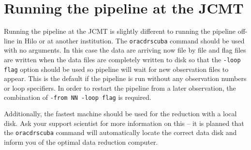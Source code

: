 \documentclass[twoside,11pt]{article}
\newcommand{\xlabel}[1]{}
\renewcommand{\_}{\texttt{\symbol{95}}}
\begin{document}
\section{Running the pipeline at the JCMT\xlabel{running_the_pipeline_at_the_jcmt}}

Running the pipeline at the JCMT is slightly different to running the pipeline
off-line in Hilo or at another institution.  The \texttt{oracdr\_scuba} command
should be used with no arguments.  In this case the data are arriving now file
by file and flag files are written when the data files are completely written
to disk so that the \texttt{-loop flag} option should be used so pipeline will
wait for new observation files to appear. This is the default if the pipeline
is run without any observation numbers or loop specifiers.  In order to
restart the pipeline from a later observation, the combination of
\texttt{-from NN -loop flag} is required.

Additionally, the fastest machine should be used for the reduction
with a local disk. Ask your support scientist for more information
on this -- it is planned that the \texttt{oracdr\_scuba} command
will automatically locate the correct data disk and inform you
of the optimal data reduction computer.



\end{document}

